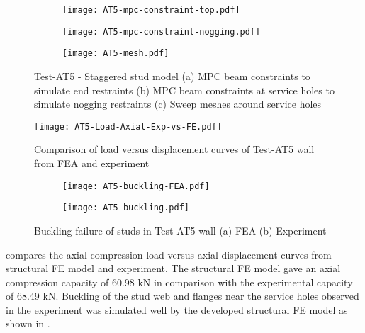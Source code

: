 \begin{figure}[!htbp]
	\centering
	\begin{subfigure}[b]{0.3\textwidth}
		\centering
		\texttt{[image: AT5-mpc-constraint-top.pdf]}
		\caption{}
		\label{subfig:AT5-mpc-constraint-top}
	\end{subfigure}
	\begin{subfigure}[b]{0.5\textwidth}
		\centering
		\texttt{[image: AT5-mpc-constraint-nogging.pdf]}
		\caption{}
		\label{subfig:AT5-mpc-constraint-nogging}
	\end{subfigure}
	\begin{subfigure}[b]{0.5\textwidth}
		\centering
		\texttt{[image: AT5-mesh.pdf]}
		\caption{}
		\label{subfig:AT5-mesh}
	\end{subfigure}
	   \caption{Test-AT5 - Staggered stud model (a) MPC beam constraints to simulate end restraints (b) MPC beam constraints at service holes to simulate nogging restraints (c) Sweep meshes around service holes}
	   \label{fig:AT5-modelling-fea}
\end{figure} 
\begin{figure}[!htbp]
	\centering
		\texttt{[image: AT5-Load-Axial-Exp-vs-FE.pdf]}\\
		\caption{Comparison of load versus displacement curves of Test-AT5 wall from FEA and experiment}
	\label{fig:AT5-fea}
\end{figure}
\begin{figure}[!htbp]
	\centering
	\begin{subfigure}[b]{0.4\textwidth}
		\centering
		\texttt{[image: AT5-buckling-FEA.pdf]}
		\caption{}
		\label{subfig:AT5-buckling-FEA}
	\end{subfigure}
	\begin{subfigure}[b]{0.4\textwidth}
		\centering
		\texttt{[image: AT5-buckling.pdf]}
		\caption{}
		\label{subfig:AT5-buckling-experiment}
	\end{subfigure}
	   \caption{Buckling failure of studs in Test-AT5 wall (a) FEA (b) Experiment}
	   \label{fig:AT5-buckling-fea-comparison}
\end{figure} 

 compares the axial compression load versus axial displacement curves from structural FE model and experiment. The structural FE model gave an axial compression capacity of 60.98 kN in comparison with the experimental capacity of 68.49 kN. Buckling of the stud web and flanges near the service holes observed in the experiment was simulated well by the developed structural FE model as shown in . 

